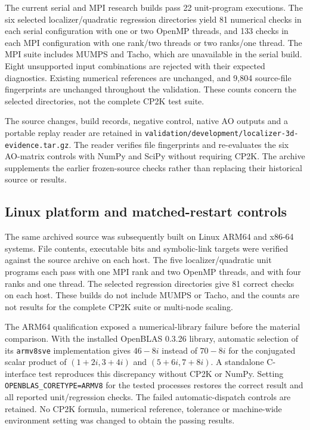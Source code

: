 \documentclass[11pt]{article}
\begin{document}
The current serial and MPI research builds pass 22 unit-program
executions. The six selected localizer/quadratic regression
directories yield 81 numerical checks in each serial configuration
with one or two OpenMP threads, and 133 checks in each MPI
configuration with one rank/two threads or two ranks/one thread.
The MPI suite includes MUMPS and Tacho, which are unavailable in
the serial build. Eight unsupported input combinations are rejected
with their expected diagnostics. Existing numerical references
are unchanged, and 9,804 source-file fingerprints are unchanged
throughout the validation. These counts concern the selected
directories, not the complete CP2K test suite.

The source changes, build records, negative control, native AO
outputs and a portable replay reader are retained in
\nolinkurl{validation/development/localizer-3d-evidence.tar.gz}.
The reader verifies file fingerprints and re-evaluates the six
AO-matrix controls with NumPy and SciPy without requiring CP2K.
The archive supplements the earlier frozen-source checks rather
than replacing their historical source or results.

\subsection{Linux platform and matched-restart controls}
The same archived source was subsequently built on Linux ARM64
and x86-64 systems. File contents, executable bits and symbolic-link
targets were verified against the source archive on each host.
The five localizer/quadratic unit programs each pass with one MPI
rank and two OpenMP threads, and with four ranks and one thread.
The selected regression directories give 81 correct checks on
each host. These builds do not include MUMPS or Tacho, and the
counts are not results for the complete CP2K suite or multi-node
scaling.

The ARM64 qualification exposed a numerical-library failure before
the material comparison. With the installed OpenBLAS 0.3.26 library,
automatic selection of its \texttt{armv8sve} implementation gives
$46-8i$ instead of $70-8i$ for the conjugated scalar product of
$(1+2i,3+4i)$ and $(5+6i,7+8i)$. A standalone C-interface test
reproduces this discrepancy without CP2K or NumPy.
Setting \texttt{OPENBLAS\_CORETYPE=ARMV8} for the tested processes
restores the correct result and all reported unit/regression checks.
The failed automatic-dispatch controls are retained. No CP2K
formula, numerical reference, tolerance or machine-wide environment
setting was changed to obtain the passing results.
\end{document}
